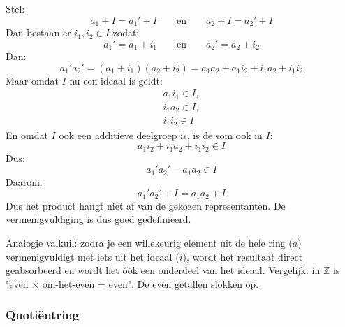 Stel:
\begin{equation*}
    a_1 + I = a_1' + I \qquad \text{en} \qquad a_2 + I = a_2' + I
\end{equation*}
Dan bestaan er $i_1,i_2 \in I$ zodat:
\begin{equation*}
    a_1' = a_1 + i_1 \qquad \text{en} \qquad a_2' = a_2 + i_2
\end{equation*}
Dan:
\begin{equation*}
    a_1'a_2' = (a_1 + i_1)(a_2 + i_2) = a_1a_2 + a_1i_2 + i_1a_2 + i_1i_2
\end{equation*}
Maar omdat $I$ nu een ideaal is geldt:
\begin{equation*}
    \begin{gathered}
        a_1i_1 \in I,\\
        i_1a_2 \in I,\\
        i_1i_2 \in I
    \end{gathered}
\end{equation*}
En omdat $I$ ook een additieve deelgroep is, is de som ook in $I$:
\begin{equation*}
    a_1i_2 + i_1a_2 + i_1i_2 \in I
\end{equation*}
Dus:
\begin{equation*}
    a_1'a_2' - a_1a_2 \in I
\end{equation*}
Daarom:
\begin{equation*}
    a_1'a_2' + I = a_1a_2 + I
\end{equation*}
 Dus het product hangt niet af van de gekozen representanten. De vermenigvuldiging is dus goed gedefinieerd.

\begin{roundbox}[CornflowerBlue!10][RoyalPurple]
    Analogie valkuil: zodra je een willekeurig element uit de hele ring ($a$) vermenigvuldigt met iets uit het ideaal ($i$), wordt het resultaat direct geabsorbeerd en wordt het óók een onderdeel van het ideaal. Vergelijk: in $\mathbb{Z}$ is "even $\times$ om-het-even = even". De even getallen slokken op.
\end{roundbox}

\subsubsection{Quotiëntring}

